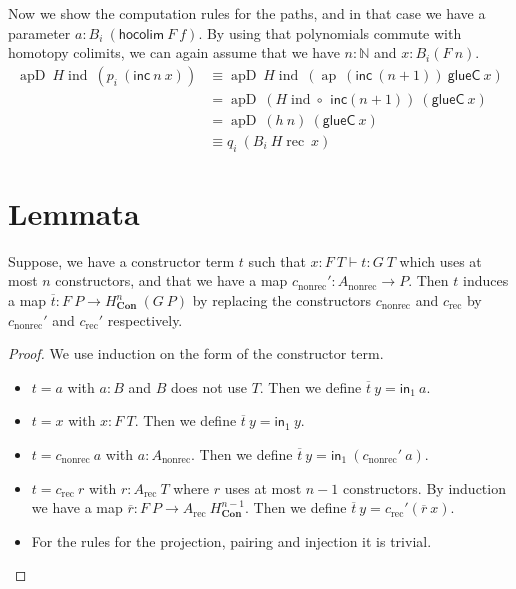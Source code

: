 \documentclass[a4paper,UKenglish]{lipics-v2016}
\newcommand{\Boperator}[1]{\mathsf{#1}}
\newcommand{\inn}{\Boperator{in}}
\newcommand{\comp}[0]{\circ \,}
\newcommand{\frec}[0]{\!\operatorname{rec}}
\newcommand{\ind}[0]{\!\operatorname{ind}}
\newcommand{\rec}[0]{\operatorname{rec}}
\newcommand{\nonrec}[0]{\operatorname{nonrec}}
\newcommand{\ap}[0]{\operatorname{ap}}
\newcommand{\apd}[0]{\operatorname{apD}}
\newcommand{\Con}[0]{\textbf{Con}}
\newcommand{\glueC}[0]{\Boperator{glueC}}
\newcommand{\hocolim}[0]{\Boperator{hocolim}}
\newcommand{\inc}[0]{\Boperator{inc}}
\begin{document}
Now we show the computation rules for the paths, and in that case we have a parameter $a : B_i \> (\hocolim \> F \> f)$.
By using that polynomials commute with homotopy colimits, we can again assume that we have $n : \mathbb{N}$ and $x : B_i(F \> n)$.
\begin{equation*}
\begin{split}
\apd \> H\ind \> (p_i \> (\inc \> n \> x))
&\equiv \apd \> H\ind \> (\ap \> (\inc \> (n+1)) \> \glueC \> x)\\
&= \apd \> (H\ind \comp  \> \inc (n+1)) \> (\glueC \> x)\\
&= \apd \> (h \> n) \> (\glueC \> x)\\
&\equiv q_i \> (B_i \> H\frec \> x)
\end{split}
\end{equation*}


\section{Lemmata}
\label{sec:Lemmata}
\begin{lemma}
\label{lem:constrTerm}
Suppose, we have a constructor term $t$ such that $x : F \> T \vdash t : G \>T$ which uses at most $n$ constructors, and that we have a map $c_{\nonrec}' : A_{\nonrec} \rightarrow P$.
Then $t$ induces a map $\overline{t} : F \> P \rightarrow H_{\Con}^n \> (G \> P)$ by replacing the constructors $c_{\nonrec}$ and $c_{\rec}$ by $c_{\nonrec}'$ and $c_{\rec}'$ respectively.
\end{lemma}

\begin{proof}
We use induction on the form of the constructor term.
\begin{itemize}
        \item $t = a$ with $a : B$ and $B$ does not use $T$. Then we define $\overline{t} \> y = \inn_1 \> a$.
        \item $t = x$ with $x : F \> T$. Then we define $\overline{t} \> y = \inn_1 \> y$.
        \item $t = c_{\nonrec} \> a$ with $a : A_{\nonrec}$. Then we define $\overline{t} \> y = \inn_1 \> (c_{\nonrec}' \> a)$.
        \item $t = c_{\rec} \> r$ with $r : A_{\rec} \> T$ where $r$ uses at most $n-1$ constructors. 
        By induction we have a map $\overline{r} : F \> P \rightarrow A_{\rec} \> H_{\Con}^{n-1}$.
        Then we define $\overline{t} \> y = c_{\rec}' (\overline{r} \> x)$.
        \item For the rules for the projection, pairing and injection it is trivial. \qedhere
\end{itemize}
\end{proof}
\end{document}
